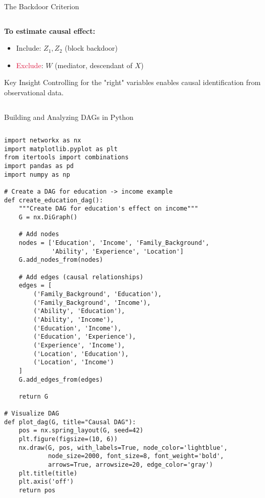 \documentclass[aspectratio=169,11pt]{beamer}
\begin{document}
\begin{frame}{The Backdoor Criterion}
\begin{columns}
\begin{column}{0.5\textwidth}
\textbf{To estimate causal effect:}
\begin{itemize}
\item \textcolor{forest}{Include}: $Z_1, Z_2$ (block backdoor)
\item \textcolor{crimson}{Exclude}: $W$ (mediator, descendant of $X$)
\end{itemize}

\begin{alertblock}{Key Insight}
Controlling for the "right" variables enables causal identification from observational data.
\end{alertblock}
\end{column}
\end{columns}
\end{frame}

\begin{frame}[fragile]{Building and Analyzing DAGs in Python}
\begin{columns}
\begin{column}{0.55\textwidth}
\begin{lstlisting}[basicstyle=\ttfamily\tiny]
import networkx as nx
import matplotlib.pyplot as plt
from itertools import combinations
import pandas as pd
import numpy as np

# Create a DAG for education -> income example
def create_education_dag():
    """Create DAG for education's effect on income"""
    G = nx.DiGraph()
    
    # Add nodes
    nodes = ['Education', 'Income', 'Family_Background', 
             'Ability', 'Experience', 'Location']
    G.add_nodes_from(nodes)
    
    # Add edges (causal relationships)
    edges = [
        ('Family_Background', 'Education'),
        ('Family_Background', 'Income'),
        ('Ability', 'Education'),
        ('Ability', 'Income'),
        ('Education', 'Income'),
        ('Education', 'Experience'),
        ('Experience', 'Income'),
        ('Location', 'Education'),
        ('Location', 'Income')
    ]
    G.add_edges_from(edges)
    
    return G

# Visualize DAG
def plot_dag(G, title="Causal DAG"):
    pos = nx.spring_layout(G, seed=42)
    plt.figure(figsize=(10, 6))
    nx.draw(G, pos, with_labels=True, node_color='lightblue',
            node_size=2000, font_size=8, font_weight='bold',
            arrows=True, arrowsize=20, edge_color='gray')
    plt.title(title)
    plt.axis('off')
    return pos


\end{lstlisting}
\end{column}
\end{columns}
\end{frame}
\end{document}
